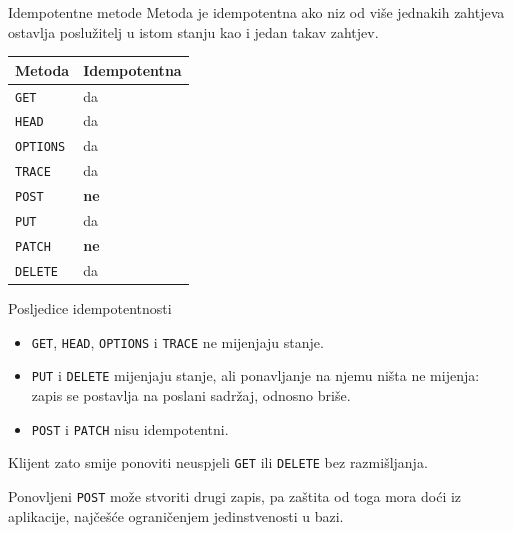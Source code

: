 \begin{frame}{Idempotentne metode}
Metoda je idempotentna ako niz od više jednakih zahtjeva ostavlja poslužitelj u istom stanju kao i jedan takav zahtjev.

\vspace{0.6em}
\begin{center}
{\small
\setlength{\tabcolsep}{14pt}
\renewcommand{\arraystretch}{1.15}
\begin{tabular}{@{}ll@{}}
  \toprule
  \textbf{Metoda} & \textbf{Idempotentna} \\
  \midrule
  \texttt{GET}     & da \\
  \texttt{HEAD}    & da \\
  \texttt{OPTIONS} & da \\
  \texttt{TRACE}   & da \\
  \texttt{POST}    & \textbf{ne} \\
  \texttt{PUT}     & da \\
  \texttt{PATCH}   & \textbf{ne} \\
  \texttt{DELETE}  & da \\
  \bottomrule
\end{tabular}
}
\end{center}
\end{frame}

\begin{frame}{Posljedice idempotentnosti}
\begin{itemize}
  \itemsep0.6em
  \item \texttt{GET}, \texttt{HEAD}, \texttt{OPTIONS} i \texttt{TRACE} ne mijenjaju stanje.
  \item \texttt{PUT} i \texttt{DELETE} mijenjaju stanje, ali ponavljanje na njemu ništa ne mijenja: zapis se postavlja na poslani sadržaj, odnosno briše.
  \item \texttt{POST} i \texttt{PATCH} nisu idempotentni.
\end{itemize}

\vspace{1.1em}
Klijent zato smije ponoviti neuspjeli \texttt{GET} ili \texttt{DELETE} bez razmišljanja.

\vspace{0.7em}
Ponovljeni \texttt{POST} može stvoriti drugi zapis, pa zaštita od toga mora doći iz aplikacije, najčešće ograničenjem jedinstvenosti u bazi.
\end{frame}

